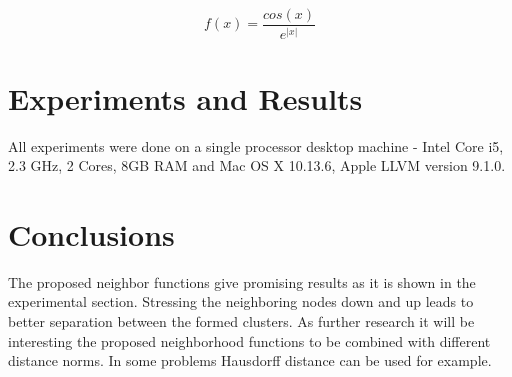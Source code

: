 \documentclass[runningheads]{llncs}
\begin{document}
\begin{equation} \label{equ02}
f(x) = \frac{cos(x)}{e^{|x|}}
\end{equation}

\section{Experiments and Results}

All experiments were done on a single processor desktop machine - Intel Core i5, 2.3 GHz, 2 Cores, 8GB RAM and Mac OS X 10.13.6, Apple LLVM version 9.1.0.

\section{Conclusions}

The proposed neighbor functions give promising results as it is shown in the experimental section. Stressing the neighboring nodes down and up leads to better separation between the formed clusters. As further research it will be interesting the proposed neighborhood functions to be combined with different distance norms. In some problems Hausdorff distance can be used for example. 
\end{document}
